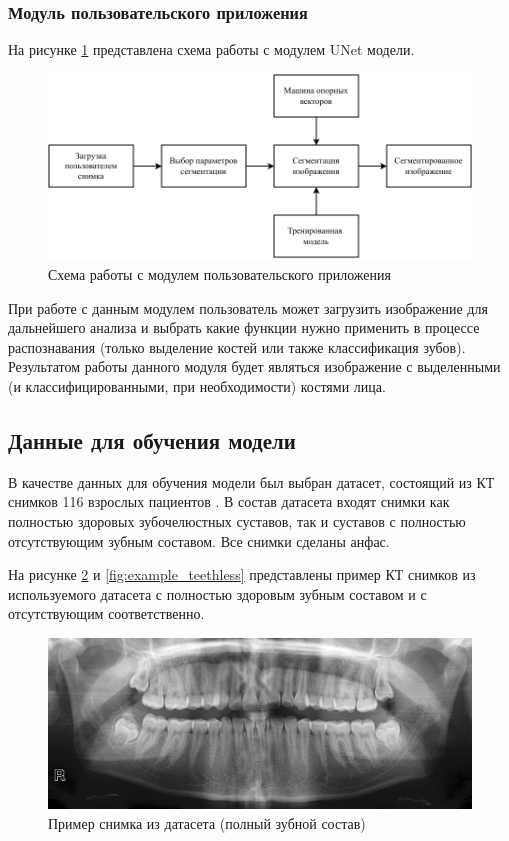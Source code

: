 \subsubsection{Модуль пользовательского приложения}

На рисунке \ref{fig:appuser} представлена схема работы с модулем UNet модели.

\begin{figure}[H]
	\centering
	\includegraphics[width=\textwidth]{img/appuser.pdf}
	\caption{Схема работы с модулем пользовательского приложения}
	\label{fig:appuser}
\end{figure}

При работе с данным модулем пользователь может загрузить изображение для дальнейшего анализа и выбрать какие функции нужно применить в процессе распознавания (только выделение костей или также классификация зубов). Результатом работы данного модуля будет являться изображение с выделенными (и классифицированными, при необходимости) костями лица.

\subsection{Данные для обучения модели}

В качестве данных для обучения модели был выбран датасет, состоящий из КТ снимков 116 взрослых пациентов \cite{dataset}. В состав датасета входят снимки как полностью здоровых зубочелюстных суставов, так и суставов с полностью отсутствующим зубным составом. Все снимки сделаны анфас.

На рисунке \ref{fig:example} и \ref{fig:example_teethless} представлены пример КТ снимков из используемого датасета с полностью здоровым зубным составом и с отсутствующим соответственно.

\begin{figure}[H]
	\centering
	\includegraphics[width=\textwidth]{img/example.png}
	\caption{Пример снимка из датасета (полный зубной состав)}
	\label{fig:example}
\end{figure}

